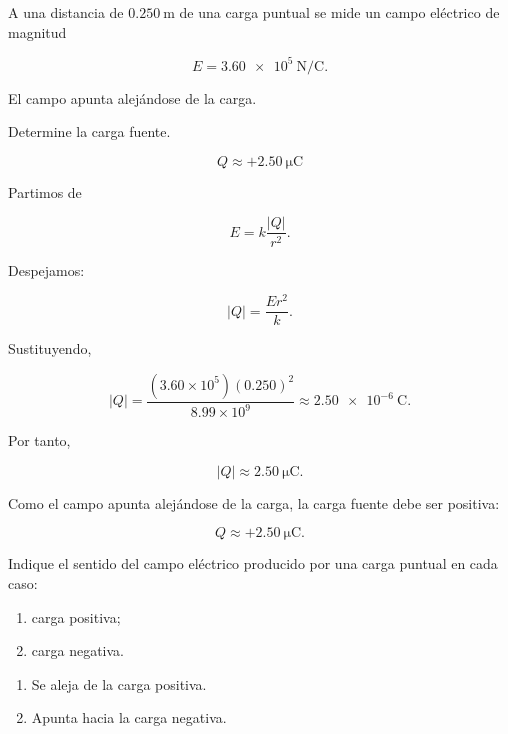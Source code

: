 \begin{ejercicio}

A una distancia de \(\SI{0.250}{\metre}\) de una carga puntual se mide un campo eléctrico de magnitud

\[
E=\SI{3.60e5}{\newton\per\coulomb}.
\]

El campo apunta alejándose de la carga.

Determine la carga fuente.

\end{ejercicio}

\begin{respuesta}

\[
\boxed{Q\approx+\SI{2.50}{\micro\coulomb}}
\]

\end{respuesta}

\begin{explicacion}

Partimos de

\[
E=k\frac{|Q|}{r^2}.
\]

Despejamos:

\[
|Q|=\frac{Er^2}{k}.
\]

Sustituyendo,

\[
|Q|=
\frac{(3.60\times10^5)(0.250)^2}{8.99\times10^9}
\approx\SI{2.50e-6}{\coulomb}.
\]

Por tanto,

\[
|Q|\approx\SI{2.50}{\micro\coulomb}.
\]

Como el campo apunta alejándose de la carga, la carga fuente debe ser positiva:

\[
\boxed{Q\approx+\SI{2.50}{\micro\coulomb}}.
\]

\end{explicacion}


\begin{ejercicio}

Indique el sentido del campo eléctrico producido por una carga puntual en cada caso:

\begin{enumerate}
    \item carga positiva;
    \item carga negativa.
\end{enumerate}

\end{ejercicio}

\begin{respuesta}

\begin{enumerate}
    \item Se aleja de la carga positiva.
    \item Apunta hacia la carga negativa.
\end{enumerate}

\end{respuesta}

